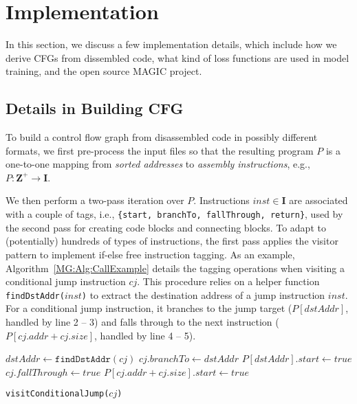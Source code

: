 \section{Implementation}
\label{MG:Sec:Implement}

In this section, we discuss a few implementation details, which include how we derive CFGs from dissembled code, what kind of loss functions are used in model training, and the open source MAGIC project.

\subsection{Details in Building CFG}
\label{MG:SubSec:BuildCfg}
To build a control flow graph from disassembled code in possibly different formats, we first pre-process the input files so that the resulting program $P$ is a one-to-one mapping from \textit{sorted addresses} to \textit{assembly instructions}, e.g., $P: \mathbf{Z}^+ \rightarrow \mathbf{I}$.

We then perform a two-pass iteration over $P$.
Instructions $inst \in \mathbf{I}$ are associated with a couple of tags,
i.e., \texttt{\{start, branchTo, fallThrough, return\}}, used by the second pass for creating code blocks and connecting blocks.
To adapt to (potentially) hundreds of types of instructions, the first pass applies the visitor pattern to implement if-else free instruction tagging.
As an example, Algorithm~\ref{MG:Alg:CallExample} details the tagging operations when visiting a conditional jump instruction $cj$.
This procedure relies on a helper function \texttt{findDstAddr($inst$)} to extract the destination address of a jump instruction $inst$.
For a conditional jump instruction,
it branches to the jump target ($P[dstAddr]$, handled by line 2 -- 3) and falls through to the next instruction ($P[cj.addr + cj.size]$, handled by line 4 -- 5).


\begin{algorithm}[t]
    \DontPrintSemicolon
    $dstAddr \gets \texttt{findDstAddr}(cj)$\;
    $cj.branchTo \gets dstAddr$\;
    $P[dstAddr].start \gets true$\;
    $cj.fallThrough \gets true$\;
    $P[cj.addr + cj.size].start \gets true$\;
    \caption{\texttt{visitConditionalJump($cj$)}}
    \label{MG:Alg:CallExample}
\end{algorithm}

